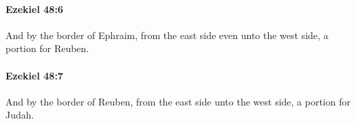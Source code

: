 		\paragraph{Ezekiel 48:6} %
			\label{EZEKIEL-48-6}

			And by the border of Ephraim, from the east side even unto the west side, a portion for Reuben.


		\paragraph{Ezekiel 48:7} %
			\label{EZEKIEL-48-7}

			And by the border of Reuben, from the east side unto the west side, a portion for Judah.


